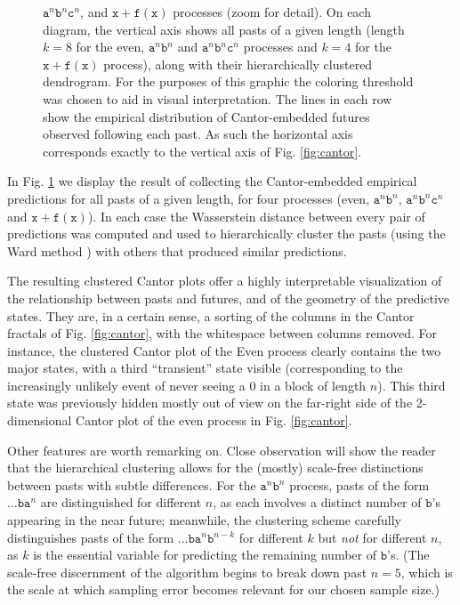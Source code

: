 \documentclass[sigconf, anonymous, review]{acmart}
\begin{document}
\begin{figure}[ht]
{  $\mathtt{a}^n\mathtt{b}^n\mathtt{c}^n$, and $\mathtt{x+f(x)}$ processes (zoom
  for detail). On
  each diagram, the vertical axis shows all pasts of a given length (length
  $k=8$ for the even, $\mathtt{a}^n\mathtt{b}^n$ and
  $\mathtt{a}^n\mathtt{b}^n\mathtt{c}^n$ processes and $k=4$ for the
  $\mathtt{x+f(x)}$ process), along with their hierarchically clustered
  dendrogram. For the purposes of this graphic the coloring threshold was
  chosen to aid in visual interpretation. The lines in each row show the
  empirical distribution of Cantor-embedded futures observed following each
  past. As such the horizontal axis corresponds exactly to the vertical axis of
  Fig. \ref{fig:cantor}.}
    \label{fig:hclust}
\end{figure}
In Fig. \ref{fig:hclust} we display the result of collecting the Cantor-embedded
empirical predictions for all pasts of a given length, for four processes (even,
$\mathtt{a}^n \mathtt{b}^n$, $\mathtt{a}^n \mathtt{b}^n \mathtt{c}^n$ and
$\mathtt{x+f(x)}$). In each case the Wasserstein distance between every pair of
predictions was computed and used to hierarchically cluster the pasts (using the
Ward method \cite{Mull11a}) with
others that produced similar predictions.

The resulting clustered Cantor plots offer a highly interpretable visualization
of the relationship between pasts and futures, and of the geometry of the
predictive states. They are, in a certain sense, a sorting of the columns in the
Cantor fractals of Fig. \ref{fig:cantor}, with the whitespace between columns
removed. For instance, the clustered Cantor plot of the Even process clearly
contains the two major states, with a third ``transient'' state visible
(corresponding to the increasingly unlikely event of never seeing a $0$ in a
block of length $n$). This third state was previously hidden mostly out of view
on the far-right side of the 2-dimensional Cantor plot of the even process in
Fig. \ref{fig:cantor}.

Other features are worth remarking on. Close observation will show the reader
that the hierarchical clustering allows for the (mostly) scale-free distinctions
between pasts with subtle differences. For the $\mathtt{a}^n \mathtt{b}^n$
process, pasts of the form $\dots \mathtt{b a}^n$ are distinguished for
different $n$, as each involves a distinct number of $\mathtt{b}$'s appearing in
the near future; meanwhile, the clustering scheme carefully distinguishes pasts
of the form $\dots \mathtt{b a}^n \mathtt{b}^{n-k}$ for different $k$ but
\emph{not} for different $n$, as $k$ is the essential variable for predicting
the remaining number of $\mathtt{b}$'s. (The scale-free discernment of the
algorithm begins to break down past $n=5$, which is the scale at which sampling
error becomes relevant for our chosen sample size.)
\end{document}
